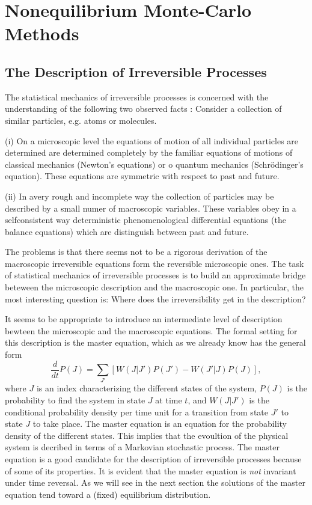 \chapter{Nonequilibrium Monte-Carlo Methods}

\section{The Description of Irreversible Processes}
The statistical mechanics of irreversible processes is concerned with the
understanding of the following two observed facts \cite{vanKampenFund}:
Consider a collection of similar particles, e.g. atoms or molecules.

(i) On a microscopic level the equations of motion of all individual particles
are determined are determined completely by the familiar equations of motions
of classical mechanics (Newton's equations) or o quantum mechanics
(Schr\"odinger's equation). These equations are symmetric with respect to past
and future.

(ii) In avery rough and incomplete way the collection of particles may be
described by a small numer of macroscopic variables. These variables obey in a
selfconsistent way 
deterministic phenomenological differential equations (the balance equations) 
which are distinguish between past and future.

The problems is that there seems not to be a rigorous derivation of the
macroscopic irreversible equations form the reversible microscopic ones.
The task of statistical mechanics of irreversible processes  is to build an
approximate bridge beteween the microscopic description and the macroscopic
one. In particular, the most interesting question is: Where does the
irreversibility get in the description?

It seems to be appropriate to introduce an intermediate level of description
bewteen the microscopic and the macroscopic equations. The formal setting for
this description is the master equation, which as we already know has the
general form
\begin{displaymath}
  \frac{d}{dt} P(J) = \sum_{J'} [ W(J|J') P(J') - W(J'|J)P(J)],
\end{displaymath}
where $J$ is an index characterizing the different states of the system,
$P(J)$ is the probability to find the system in state $J$ at time $t$, and
$W(J|J')$ is the conditional probability density per time unit for a
transition from state $J'$ to state $J$ to take place. The master equation is
an equation for the  probability density of the different states. This implies
that the evoultion of the physical system is decribed in terms of a Markovian 
stochastic process. The master equation is
a good candidate for the description of irreversible processes 
because of some of its properties. It is evident that the
master equation is \textit{not} invariant under time reversal. As we will see
in the next section  the solutions of the master equation tend toward a
(fixed) equilibrium  distribution.

